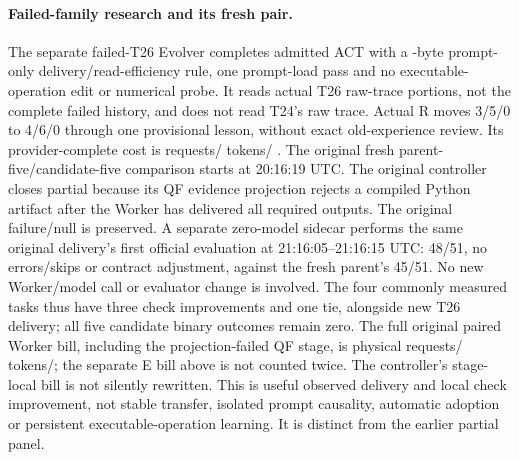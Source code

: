\paragraph{Failed-family research and its fresh pair.}
The separate failed-T26 Evolver completes admitted ACT with a
\FamilyFailurePromptBytes{}-byte prompt-only delivery/read-efficiency rule,
one prompt-load pass and no executable-operation edit or numerical probe.
It reads actual T26 raw-trace portions, not the complete failed history, and
does not read T24's raw trace. Actual R moves 3/5/0 to 4/6/0 through one
provisional lesson, without exact old-experience review. Its provider-complete
cost is \FamilyFailureERequests{} requests/\FamilyFailureETokens{} tokens/
\FamilyFailureECost{}.
The original fresh parent-five/candidate-five comparison starts at 20:16:19 UTC.
The original controller closes partial because its QF evidence projection
rejects a compiled Python artifact after the Worker has delivered all required
outputs. The original failure/null is preserved. A separate zero-model sidecar
performs the same original delivery's first official evaluation at
21:16:05--21:16:15 UTC: 48/51, no errors/skips or contract adjustment, against
the fresh parent's 45/51. No new Worker/model call or evaluator change is involved.
The four commonly measured tasks thus have three check improvements and one
tie, alongside new T26 delivery; all five candidate binary outcomes remain zero.
The full original paired Worker bill, including the projection-failed QF stage,
is \FamilyFailurePairRequests{} physical requests/
\FamilyFailurePairTokens{} tokens/\FamilyFailurePairCost{}; the separate E bill
above is not counted twice. The controller's stage-local bill is not silently
rewritten. This is useful observed delivery and local check improvement, not
stable transfer, isolated prompt causality, automatic adoption or persistent
executable-operation learning. It is distinct from the earlier partial panel.

